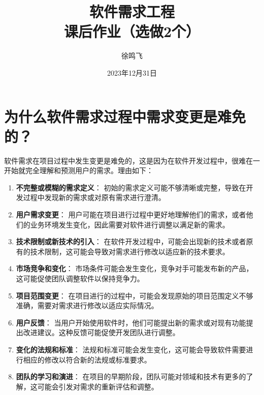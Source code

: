 \documentclass[11pt, a4paper, oneside]{ctexbook}
\title{{\Huge{\textbf{软件需求工程}}}\\课后作业（选做2个）}
\author{徐鸣飞}
\date{2023年12月31日}
\let\kaishu\relax                               %
\begin{document}
\maketitle

\newpage
{}
\setcounter{page}{1}
\tableofcontents
\newpage
\setcounter{page}{1}

\chapter{为什么软件需求过程中需求变更是难免的？}

软件需求在项目过程中发生变更是难免的，这是因为在软件开发过程中，很难在一开始就完全理解和预测用户的需求。理由如下：

\begin{enumerate}
    \item {\bfseries\kaishu 不完整或模糊的需求定义}： 初始的需求定义可能不够清晰或完整，导致在开发过程中发现新的需求或对原有需求进行澄清。
    \item {\bfseries\kaishu 用户需求变更}： 用户可能在项目进行过程中更好地理解他们的需求，或者他们的业务环境发生变化，因此需要对软件进行调整以满足新的需求。
    \item {\bfseries\kaishu 技术限制或新技术的引入}： 在软件开发过程中，可能会出现新的技术或者原有的技术限制，这可能会导致对需求进行修改以适应新的技术要求。
    \item {\bfseries\kaishu 市场竞争和变化}： 市场条件可能会发生变化，竞争对手可能发布新的产品，这可能促使团队调整软件以保持竞争力。
    \item {\bfseries\kaishu 项目范围变更}： 在项目进行的过程中，可能会发现原始的项目范围定义不够准确，需要对需求进行修改以适应实际情况。
    \item {\bfseries\kaishu 用户反馈}： 当用户开始使用软件时，他们可能提出新的需求或对现有功能提出改进建议。这种反馈可能促使开发团队进行调整。
    \item {\bfseries\kaishu 变化的法规和标准}： 法规和标准可能会发生变化，这可能会导致软件需要进行相应的修改以符合新的法规或标准要求。
    \item {\bfseries\kaishu 团队的学习和演进}： 在项目的早期阶段，团队可能对领域和技术有更多的了解，这可能会引发对需求的重新评估和调整。
\end{enumerate}
\end{document}

